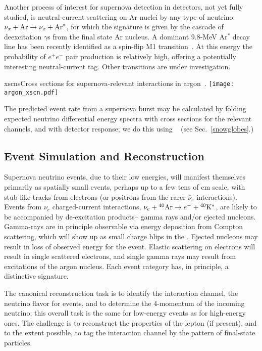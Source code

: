 Another process of interest for supernova detection in  detectors,
not yet fully studied,  is neutral-current  scattering on Ar nuclei by
any type of neutrino: $\nu_x + {\rm Ar} \rightarrow \nu_x + {\rm
  Ar}^*$,  for which the signature is given by the cascade of
deexcitation $\gamma$s from the final state Ar nucleus.  A dominant
9.8-MeV Ar$^*$ decay line has been recently identified as a spin-flip
M1 transition~\cite{Hayes}.   At this energy the probability of
$e^+e^-$ pair production is relatively high, offering a potentially
interesting neutral-current tag.  Other transitions are under investigation.


\begin{dunefigure}{xscns}{Cross sections for supernova-relevant interactions in argon~\cite{GilBotella:2003sz,snowglobes}.}
\texttt{[image: argon\_xscn.pdf]}
\end{dunefigure}

The predicted event rate from a supernova burst may be calculated by
folding expected neutrino differential energy spectra with cross
sections for the relevant channels, and with detector response; we do
this using ~\cite{snowglobes} (see Sec.~\ref{snowglobes}.)


\subsection{Event Simulation and Reconstruction}

Supernova neutrino events, due to their low energies, will manifest
themselves primarily as spatially small events, perhaps up to a few tens of cm
scale, with stub-like tracks from
electrons (or positrons from the rarer $\bar{\nu}_e$ interactions).
Events from $\nu_e $ charged-current interactions, $\nu_e+{}^{40}{\rm
  Ar}\rightarrow e^{-}+{}^{40}{\rm K}^{*}$, are likely to be
accompanied by de-excitation products-- gamma rays and/or ejected
nucleons. Gamma-rays are in principle observable via energy deposition
from Compton scattering, which will show up as small charge blips in
the .  
Ejected nucleons may result in loss of observed energy for
the event.  Elastic scattering on electrons will result in single
scattered electrons, and single gamma rays may result from  
excitations of the argon nucleus.   Each event category has, in principle, a
distinctive signature.

The canonical reconstruction task is to identify the interaction
channel, the neutrino flavor for  events, and to determine the
4-momentum of the incoming neutrino; this overall task is the same for
low-energy events as for high-energy ones.  The challenge is to
reconstruct the properties of the lepton (if present), and to the extent
possible, to tag the interaction channel by the pattern of final-state
particles.

